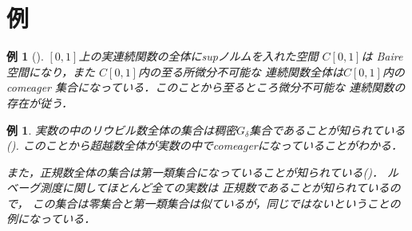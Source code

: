 \documentclass[leqno, 12pt]{jsarticle}
\newtheorem{exam}[thm]{例}
\begin{document}
\section{例}

\begin{exam}[\cite{B}\cite{MM}]
$[0, 1]$上の実連続関数の全体にsupノルムを入れた空間
$C[0, 1]$は
Baire空間になり，また
$C[0, 1]$内の至る所微分不可能な
連続関数全体は$C[0, 1]$内のcomeager
集合になっている．このことから至るところ微分不可能な
連続関数の存在が従う．

\end{exam}

\begin{exam}
実数の中のリウビル数全体の集合は稠密$G_{\delta}$集合であることが知られている
(\cite{aa}). 
このことから超越数全体が実数の中でcomeagerになっていることがわかる．

また，正規数全体の集合は第一類集合になっていることが知られている(\cite{salat})．
ルベーグ測度に関してほとんど全ての実数は
正規数であることが知られているので，
この集合は零集合と第一類集合は似ているが，同じではないということの例になっている．
\end{exam}



\end{document}
